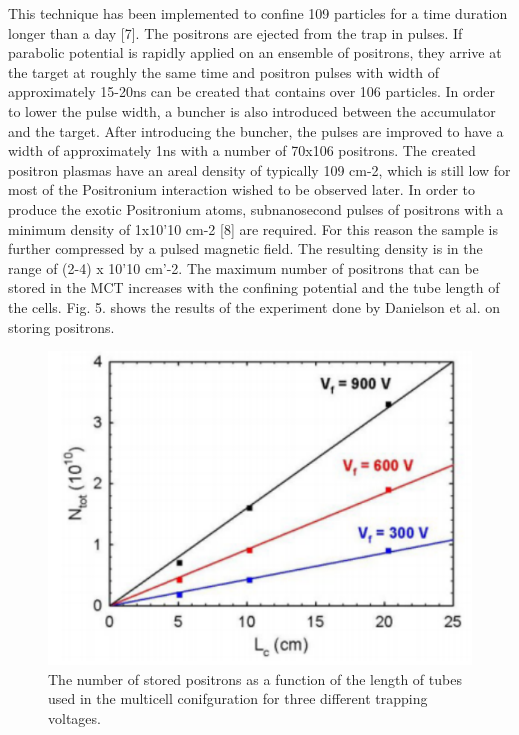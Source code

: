 This technique has been implemented to confine 109 particles for a time duration longer than a day [7]. The positrons are ejected from the trap in pulses. If parabolic potential is rapidly applied on an ensemble of positrons, they arrive at the target at roughly the same time and positron pulses with width of approximately 15-20ns can be created that contains over 106 particles. In order to lower the pulse width, a buncher is also introduced between the accumulator and the target. After introducing the buncher, the pulses are improved to have a width of approximately 1ns with a number of 70x106 positrons. The created positron plasmas have an areal density of typically 109 cm-2, which is still low for most of the Positronium interaction wished to be observed later. In order to produce the exotic Positronium atoms, subnanosecond pulses of positrons with a minimum density of 1x10'10 cm-2 [8] are required. For this reason the sample is further compressed by a pulsed magnetic field. The resulting density is in the range of (2-4) x 10'10 cm'-2.
The maximum number of positrons that can be stored in the MCT increases with the confining potential and the tube length of the cells. Fig. 5. shows the results of the experiment done by Danielson et al. on storing positrons.

\begin{figure}[h]
\centering
\includegraphics{Figures/C2F5}
\decoRule
\caption[C2F5]{The number of stored positrons as a function of the length of tubes used in the multicell conifguration for three different trapping voltages.}
\label{fig:C2F5}
\end{figure}

